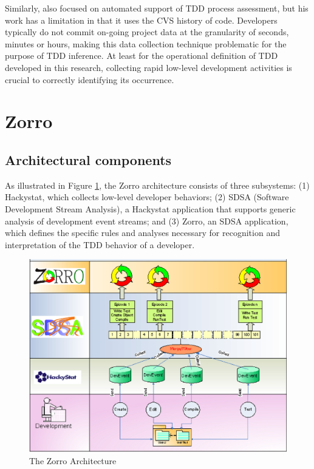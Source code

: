 \documentclass[smallextended]{svjour3}     %
\begin{document}
Similarly, \cite{Wege:04} also focused on automated support of TDD process
assessment, but his work has a limitation in that it uses the CVS history
of code. Developers typically do not commit on-going project data at the
granularity of seconds, minutes or hours, making this data collection
technique problematic for the purpose of TDD inference. At least for the
operational definition of TDD developed in this research, collecting rapid
low-level development activities is crucial to correctly identifying its
occurrence.

\section{Zorro}
\label{sec:zorro}

\subsection{Architectural components}

As illustrated in Figure \ref{fig:ZorroArchitecture}, the Zorro
architecture consists of three subsystems: (1) Hackystat, which collects
low-level developer behaviors; (2) SDSA (Software Development Stream
Analysis), a Hackystat application that supports generic analysis of
development event streams; and (3) Zorro, an SDSA application, which
defines the specific rules and analyses necessary for recognition and
interpretation of the TDD behavior of a developer.

\begin{figure}[th]
  \center
  \includegraphics[width=1.0\textwidth]{zorro-architecture.eps}
  \caption{The Zorro Architecture}
  \label{fig:ZorroArchitecture}
\end{figure} 
\end{document}
